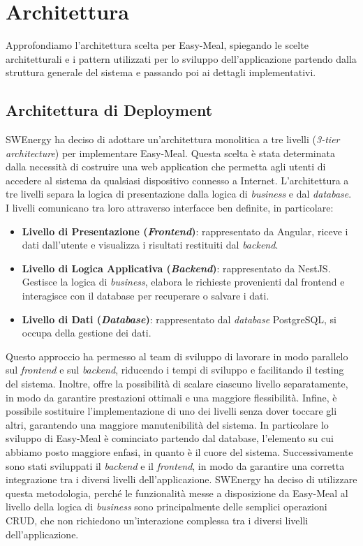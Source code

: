 \section{Architettura}

Approfondiamo l'architettura scelta per Easy-Meal, spiegando le scelte
architetturali e i pattern utilizzati per lo sviluppo dell'applicazione partendo
dalla struttura generale del sistema e passando poi ai dettagli implementativi.

\subsection{Architettura di Deployment}

SWEnergy ha deciso di adottare un'architettura monolitica a tre livelli (\textit{3-tier
architecture}) per implementare Easy-Meal. 
Questa scelta è stata determinata dalla necessità di costruire una 
web application che permetta agli utenti di accedere al sistema da qualsiasi 
dispositivo connesso a Internet. L'architettura a tre livelli
separa la logica di presentazione dalla logica di \textit{business} e dal \textit{database}.
I livelli comunicano tra loro attraverso interfacce ben definite, in particolare:
\begin{itemize}
	\item \textbf{Livello di Presentazione (\textit{Frontend})}: rappresentato da Angular, riceve i dati dall'utente e visualizza i risultati restituiti dal \textit{backend}.
	\item \textbf{Livello di Logica Applicativa (\textit{Backend})}: rappresentato da NestJS. Gestisce la logica di \textit{business}, elabora le richieste provenienti dal frontend e interagisce con il database per recuperare o salvare i dati.
	\item \textbf{Livello di Dati (\textit{Database})}: rappresentato dal \textit{database} PostgreSQL, si occupa della gestione dei dati.
\end{itemize}

Questo approccio ha permesso al team di sviluppo di lavorare in modo parallelo 
sul \textit{frontend} e sul \textit{backend}, riducendo i tempi di sviluppo e 
facilitando il 
testing del sistema. Inoltre, offre la possibilità di scalare ciascuno 
livello separatamente, in modo da garantire prestazioni ottimali e una 
maggiore flessibilità. Infine, è possibile sostituire l'implementazione di 
uno dei livelli senza dover toccare gli altri, garantendo una maggiore 
manutenibilità del sistema.
In particolare lo sviluppo di Easy-Meal è cominciato partendo dal database,
l'elemento su cui abbiamo posto maggiore enfasi, in quanto è il cuore del
sistema. Successivamente sono stati sviluppati il \textit{backend} e il
\textit{frontend}, in modo da garantire una corretta integrazione tra i
diversi livelli dell'applicazione. SWEnergy ha deciso di utilizzare questa
metodologia, perché le funzionalità messe a disposizione da Easy-Meal al livello
della logica di \textit{business} sono principalmente delle semplici operazioni CRUD, che non richiedono
un'interazione complessa tra i diversi livelli dell'applicazione.

